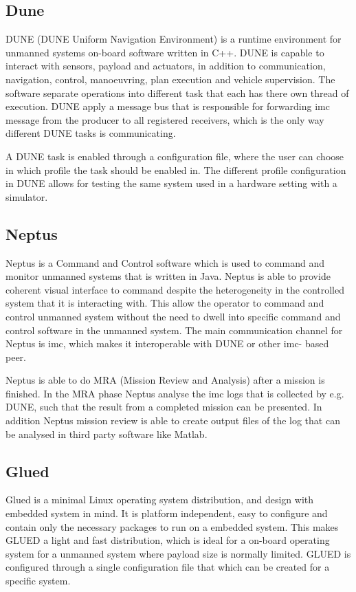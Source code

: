 \subsection{Dune}
DUNE (DUNE Uniform Navigation Environment) is a runtime environment for unmanned systems on-board software written in C++. DUNE is capable to interact with sensors, payload and actuators, in addition to communication, navigation, control, manoeuvring, plan execution and vehicle supervision. The software separate operations into different task that each has there own thread of execution. DUNE apply a message bus that is responsible for forwarding \gls{imc} message from the producer to all registered receivers, which is the only way different DUNE tasks is communicating. 

A DUNE task is enabled through a configuration file, where the user can choose in which profile the task should be enabled in. The different profile configuration in DUNE allows for testing the same system used in a hardware setting with a simulator.
\subsection{Neptus}
Neptus is a Command and Control software which is used to command and monitor unmanned systems that is written in Java. Neptus is able to provide coherent visual interface to command despite the heterogeneity in the controlled system that it is interacting with.  This allow the operator to command and control unmanned system without the need to dwell into specific command and control software in the unmanned system. The main communication channel for Neptus is \gls{imc}, which makes it interoperable with DUNE or other \gls{imc}- based peer.

Neptus is able to do MRA (Mission Review and Analysis) after a mission is finished. In the MRA phase Neptus analyse the \gls{imc} logs that is collected by e.g. DUNE, such that the result from a completed mission can be presented. In addition Neptus mission review is able to create output files of the log that can be analysed in third party software like Matlab.
\subsection{Glued}
Glued is a minimal Linux operating system distribution, and design with embedded system in mind. It is platform independent, easy to configure and contain only the necessary packages to run on a embedded system. This makes GLUED a light and fast distribution, which is ideal for a on-board operating system for a unmanned system where payload size is normally limited. GLUED is configured through a single configuration file that which can be created for a specific system.
